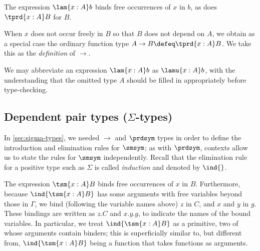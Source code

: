 The expression $\lam{x:A} b$ binds free occurrences of $x$ in $b$, as does $\tprd{x:A} B$ for
$B$.

When $x$ does not occur freely in $B$ so that $B$ does not depend on $A$, we obtain as a
special case the ordinary function type $A\to B \defeq \tprd{x:A} B$. We take this as the \emph{definition} of $\to$.

We may abbreviate an expression $\lam{x:A} b$ as $\lamu{x:A} b$, with the understanding
that the omitted type $A$ should be filled in appropriately before type-checking.

\subsection{Dependent pair types (\texorpdfstring{$\Sigma$}{Σ}-types)}
\label{sec:more-formal-sigma}

%
%

In \cref{sec:sigma-types}, we needed $\to$ and $\prdsym$ types in order to
define the introduction and elimination rules for $\smsym$; as with $\prdsym$, contexts allow us to state the rules for $\smsym$ independently.
Recall that the elimination rule for a positive type such as $\Sigma$ is called \emph{induction} and denoted by $\ind{}$.
%
%
The expression $\tsm{x:A} B$ binds free occurrences of $x$ in $B$. Furthermore, because
$\ind{\tsm{x:A} B}$ has some arguments with free variables beyond those in $\Gamma$,
we bind (following the variable names above) $z$ in $C$, and $x$ and $y$ in $g$.
These bindings are written as $z.C$ and $x.y.g$, to indicate the names of the bound
variables.
%
In particular, we treat $\ind{\tsm{x:A} B}$ as a primitive,
two of whose arguments contain binders; this is superficially similar to, but
different from, $\ind{\tsm{x:A} B}$ being a function that takes functions as
arguments.

